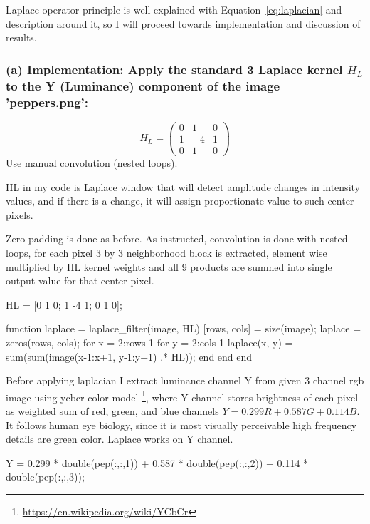 Laplace operator principle is well explained with Equation~\ref{eq:laplacian} and description around it, so I will proceed towards implementation and discussion of results.

\subsubsection{(a) Implementation: Apply the standard 3 Laplace kernel \texorpdfstring{$H_L$}{HL} to the Y (Luminance) component of the image 'peppers.png':}

\[
  H_L =
  \begin{pmatrix}
    0 & 1 & 0\\
    1 & -4 & 1\\
    0 & 1 & 0
  \end{pmatrix}
\]
Use manual convolution (nested loops).

HL in my code is Laplace window that will detect amplitude changes in intensity values, and if there is a change, it will assign proportionate value to such center pixels. 

Zero padding is done as before. As instructed, convolution is done with nested loops, for each pixel 3 by 3 neighborhood block is extracted, element wise multiplied by HL kernel weights and all 9 products are summed into single output value for that center pixel.

\codeused
\begin{matlab}
HL = [0 1 0; 1 -4 1; 0 1 0];

function laplace = laplace_filter(image, HL)
    [rows, cols] = size(image);
    laplace = zeros(rows, cols);
    for x = 2:rows-1
        for y = 2:cols-1
            laplace(x, y) = sum(sum(image(x-1:x+1, y-1:y+1) .* HL));
        end
    end
end
\end{matlab}

Before applying laplacian I extract luminance channel Y from given 3 channel rgb image using ycbcr color model \footnote{\url{https://en.wikipedia.org/wiki/YCbCr}}, where Y channel stores brightness of each pixel as weighted sum of red, green, and blue channels $Y = 0.299R + 0.587G + 0.114B$. It follows human eye biology, since it is most visually perceivable high frequency details are green color. Laplace works on Y channel.

\codeused
\begin{matlab}
Y = 0.299 * double(pep(:,:,1)) + 0.587 * double(pep(:,:,2)) + 0.114 * double(pep(:,:,3));
\end{matlab}

